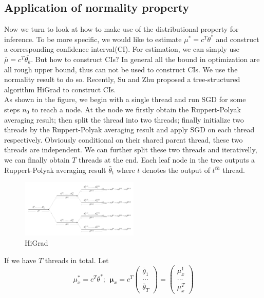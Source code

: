 





\subsection*{Application of normality property}
Now we turn to look at how to make use of the distributional property for inference. To be more specific, we would like to estimate $\mu^* = c^T\theta^*$ and construct a corresponding confidence interval(CI). For estimation, we can simply use $\bar{\mu} = c^T\bar{\theta_k}$. But how to construct CIs? In general all the bound in optimization are all rough upper bound, thus can not be used to construct CIs. We use the normality result to do so. Recently, Su and Zhu \cite{SZ16} proposed a tree-structured algorithm HiGrad to construct CIs.\\

As shown in the figure, we begin with a single thread and run SGD for some steps $n_0$ to reach a node. At the node we firstly obtain the Ruppert-Polyak averaging result; then split the thread into two threads; finally initialize two threads by the Ruppert-Polyak averaging result and apply SGD on each thread respectively. Obviously conditional on their shared parent thread, these two threads are independent. We can further split these two threads and iterativelly, we can finally obtain $T$ threads at the end. Each leaf node in the tree outputs a Ruppert-Polyak averaging result ${\bar\theta_t}$ where $t$ denotes the output of $t^{th}$ thread.\\

\begin{figure}[!hb]
	\centering
	\includegraphics[width=0.5\textwidth]{HiGrad}
		\caption{HiGrad}
\end{figure}

If we have $T$ threads in total. Let
$$
\mu _ { x } ^ { * } = c^T\theta^*; \ \ 
\boldsymbol { \mu } _ { x } = c^T\begin{pmatrix} \bar\theta_1 \\ ... \\ \bar\theta_T\end{pmatrix} = \begin{pmatrix} \mu^1_x \\ ... \\ \mu^T_x\end{pmatrix}
$$

